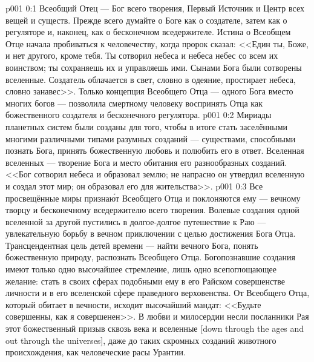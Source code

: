 \author{Божественный Советник}
\vs p001 0:1 Всеобщий Отец --- Бог всего творения, Первый Источник и Центр всех вещей и существ. Прежде всего думайте о Боге как о создателе, затем как о регуляторе и, наконец, как о бесконечном вседержителе. Истина о Всеобщем Отце начала пробиваться к человечеству, когда пророк сказал: <<Един ты, Боже, и нет другого, кроме тебя. Ты сотворил небеса и небеса небес со всем их воинством; ты сохраняешь их и управляешь ими. Сынами Бога были сотворены вселенные. Создатель облачается в свет, словно в одеяние, простирает небеса, словно занавес>>. Только концепция Всеобщего Отца --- одного Бога вместо многих богов --- позволила смертному человеку воспринять Отца как божественного создателя и бесконечного регулятора.
\vs p001 0:2 Мириады планетных систем были созданы для того, чтобы в итоге стать заселёнными многими различными типами разумных созданий --- существами, способными познать Бога, принять божественную любовь и полюбить его в ответ. Вселенная вселенных --- творение Бога и место обитания его разнообразных созданий. <<Бог сотворил небеса и образовал землю; не напрасно он утвердил вселенную и создал этот мир; он образовал его для жительства>>.
\vs p001 0:3 Все просвещённые миры призна\'ют Всеобщего Отца и поклоняются ему --- вечному творцу и бесконечному вседержителю всего творения. Волевые создания одной вселенной за другой пустились в долгое\hyp{}долгое путешествие к Раю --- увлекательную борьбу в вечном приключении с целью достижения Бога Отца. Трансцендентная цель детей времени --- найти вечного Бога, понять божественную природу, распознать Всеобщего Отца. Богопознавшие создания имеют только одно высочайшее стремление, лишь одно всепоглощающее желание: стать в своих сферах подобными ему в его Райском совершенстве личности и в его вселенской сфере праведного верховенства. От Всеобщего Отца, который обитает в вечности, исходит высочайший мандат: <<Будьте совершенны, как я совершенен>>. В любви и милосердии несли посланники Рая этот божественный призыв сквозь века и вселенные [down through the ages and out through the universes], даже до таких скромных созданий животного происхождения, как человеческие расы Урантии.
